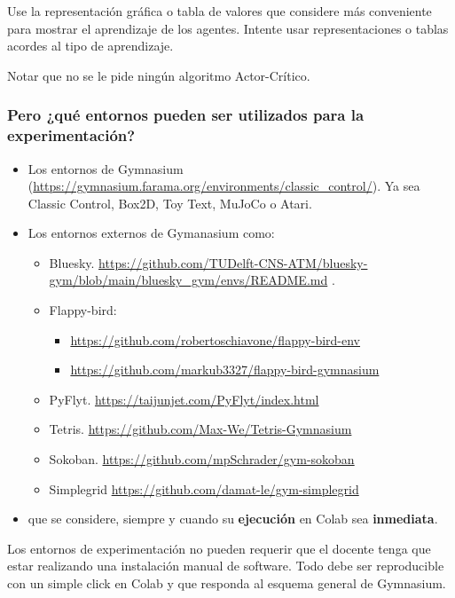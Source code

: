 \documentclass[a4paper, 11pt]{article}
\begin{document}
\begin{importantbox}
Use la representación gráfica o tabla de valores que considere más conveniente para mostrar el aprendizaje de los agentes. Intente usar representaciones o tablas acordes al tipo de aprendizaje.
\end{importantbox}


Notar que no se le pide ningún algoritmo Actor-Crítico.


\subsubsection*{Pero ¿qué entornos  pueden ser utilizados para la experimentación?}



\begin{itemize}
\item Los entornos de Gymnasium (\url{https://gymnasium.farama.org/environments/classic_control/}). Ya sea Classic Control, Box2D, Toy Text, MuJoCo o Atari.
\item Los entornos externos de Gymanasium como:
	\begin{itemize}
	\item Bluesky. \url{https://github.com/TUDelft-CNS-ATM/bluesky-gym/blob/main/bluesky_gym/envs/README.md}
.	\item Flappy-bird:	
		\begin{itemize}
		\item \url{https://github.com/robertoschiavone/flappy-bird-env}
		\item \url{https://github.com/markub3327/flappy-bird-gymnasium}
		\end{itemize}
	\item PyFlyt. \url{https://taijunjet.com/PyFlyt/index.html}
	\item Tetris. \url{https://github.com/Max-We/Tetris-Gymnasium}
	\item Sokoban. \url{https://github.com/mpSchrader/gym-sokoban}
	\item Simplegrid \url{https://github.com/damat-le/gym-simplegrid}
	\end{itemize}
	
\item {} que se considere, siempre y cuando su \textbf{ejecución} en Colab sea \textbf{inmediata}. 

\end{itemize}

\begin{importantbox}
Los entornos de experimentación no pueden requerir que el docente tenga que estar realizando una instalación manual de software. Todo debe ser reproducible con un simple click en Colab y que responda al esquema general de Gymnasium.
\end{importantbox}
\end{document}

